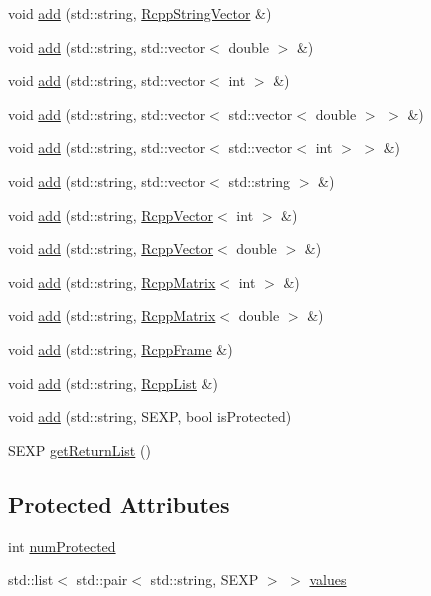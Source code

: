 \begin{DoxyCompactItemize}
void \hyperlink{classRcppResultSet_a10d01a24ef006c1ff14ca7e95fb9e0ea}{add} (std::string, \hyperlink{classRcppStringVector}{RcppStringVector} \&)
\item 
void \hyperlink{classRcppResultSet_a2b4575ca5ccc390bc5437b1be4718ca6}{add} (std::string, std::vector$<$ double $>$ \&)
\item 
void \hyperlink{classRcppResultSet_a23fa5be81281adcf3014749094816522}{add} (std::string, std::vector$<$ int $>$ \&)
\item 
void \hyperlink{classRcppResultSet_ab10cd8503c12708e27068b92a83e4047}{add} (std::string, std::vector$<$ std::vector$<$ double $>$ $>$ \&)
\item 
void \hyperlink{classRcppResultSet_ab51f30f4bd5f3c6153221a3bd7bb7e24}{add} (std::string, std::vector$<$ std::vector$<$ int $>$ $>$ \&)
\item 
void \hyperlink{classRcppResultSet_adb4236a049c8dceb7112229f5e68a295}{add} (std::string, std::vector$<$ std::string $>$ \&)
\item 
void \hyperlink{classRcppResultSet_a068cb13e27c0e26dd05e92d67eaeb7d0}{add} (std::string, \hyperlink{classRcppVector}{RcppVector}$<$ int $>$ \&)
\item 
void \hyperlink{classRcppResultSet_a10a64eb042cd3bac5b635670ae2fff5d}{add} (std::string, \hyperlink{classRcppVector}{RcppVector}$<$ double $>$ \&)
\item 
void \hyperlink{classRcppResultSet_a56f1bff720a6cf6503ab942bdb6892b3}{add} (std::string, \hyperlink{classRcppMatrix}{RcppMatrix}$<$ int $>$ \&)
\item 
void \hyperlink{classRcppResultSet_af6f50ca0a589fc12ef68c0406e83243b}{add} (std::string, \hyperlink{classRcppMatrix}{RcppMatrix}$<$ double $>$ \&)
\item 
void \hyperlink{classRcppResultSet_a9e05fb2ca92258529ffbb536e23a2a4d}{add} (std::string, \hyperlink{classRcppFrame}{RcppFrame} \&)
\item 
void \hyperlink{classRcppResultSet_a37b3d22adf1e47eec75ee664085daa59}{add} (std::string, \hyperlink{classRcppList}{RcppList} \&)
\item 
void \hyperlink{classRcppResultSet_a5f44a63a2cab43db551c0e27d6fec378}{add} (std::string, SEXP, bool isProtected)
\item 
SEXP \hyperlink{classRcppResultSet_a916989ff6c0ed1149a5f93fb6a532946}{getReturnList} ()
\end{DoxyCompactItemize}
\subsection*{Protected Attributes}
\begin{DoxyCompactItemize}
\item 
int \hyperlink{classRcppResultSet_a19edd02ac05783f9b4fd840c22e74153}{numProtected}
\item 
std::list$<$ std::pair$<$ std::string, SEXP $>$ $>$ \hyperlink{classRcppResultSet_a509f3d779c88476dea89ade9c08d403f}{values}
\end{DoxyCompactItemize}


